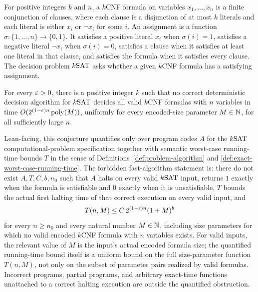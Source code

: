 \begin{definition}
  \label{def:ksat}
  For positive integers $k$ and $n$, a $k$CNF formula on variables
  $x_1,\ldots,x_n$ is a finite conjunction of clauses, where each clause is a
  disjunction of at most $k$ literals and each literal is either $x_i$ or
  $\neg x_i$ for some $i$.  An assignment is a function
  $\sigma:\{1,\ldots,n\}\to\{0,1\}$.  It satisfies a positive literal $x_i$ when
  $\sigma(i)=1$, satisfies a negative literal $\neg x_i$ when $\sigma(i)=0$,
  satisfies a clause when it satisfies at least one literal in that clause, and
  satisfies the formula when it satisfies every clause.  The decision problem
  $k\mathrm{SAT}$ asks whether a given $k$CNF formula has a satisfying assignment.
\end{definition}

\begin{conjecture}
  \label{conj:seth}
  For every $\varepsilon>0$, there is a positive integer $k$ such that no correct
  deterministic decision algorithm for $k\mathrm{SAT}$ decides all valid $k$CNF
  formulas with $n$ variables in time
  $O(2^{(1-\varepsilon)n}\operatorname{poly}(M))$, uniformly for every encoded-size parameter
  $M\in\mathbb{N}$, for all sufficiently large $n$.

  Lean-facing, this conjecture quantifies only over program codes $A$ for the
  $k\mathrm{SAT}$ computational-problem specification together with semantic
  worst-case running-time bounds $T$ in the sense of
  Definitions~\ref{def:problem-algorithm} and
  \ref{def:exact-worst-case-running-time}.  The forbidden fast-algorithm
  statement is:
  there do not exist $A,T,C,b,n_0$ such that
  $A$ halts on every valid $k\mathrm{SAT}$ input, returns $1$ exactly when the formula
  is satisfiable and $0$ exactly when it is unsatisfiable, $T$ bounds the actual
  first halting time of that correct execution on every valid input, and
  \[
    T(n,M)\leq C\,2^{(1-\varepsilon)n}(1+M)^b
  \]
  for every $n\geq n_0$ and every natural number $M\in\mathbb{N}$, including size
  parameters for which no valid encoded $k$CNF formula with $n$ variables
  exists.  For valid inputs, the relevant value of $M$ is the input's actual
  encoded formula size; the quantified running-time bound itself is a uniform
  bound on the full size-parameter function $T(n,M)$, not only on the subset of
  parameter pairs realized by valid formulas.
  Incorrect programs, partial programs, and arbitrary exact-time functions
  unattached to a correct halting execution are outside the quantified
  obstruction.
\end{conjecture}

